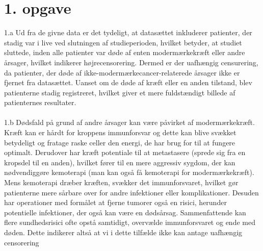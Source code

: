 \chapter{1. opgave}

1.a Ud fra de givne data er det tydeligt, at datasættet inkluderer patienter, der stadig var i live ved slutningen af studieperioden, hvilket betyder, at studiet sluttede, inden alle patienter var døde af enten modermærkekræft eller andre årsager, hvilket indikerer højrecensorering. Dermed er der uafhængig censurering, da patienter, der døde af ikke-modermærkecancer-relaterede årsager ikke er fjernet fra datasættet. Uanset om de døde af kræft eller en anden tilstand, blev patienterne stadig registreret, hvilket giver et mere fuldstændigt billede af patienternes resultater.\\\\

1.b Dødsfald på grund af andre årsager kan være påvirket af modermærkekræft. Kræft kan er hårdt for kroppens immunforsvar og dette kan blive svækket betydeligt og fratage raske celler den energi, de har brug for til at fungere optimalt. Derudover har kræft potentiale til at metastasere (sprede sig fra en kropsdel til en anden), hvilket fører til en mere aggressiv sygdom, der kan nødvendiggøre kemoterapi (man kan også få kemoterapi for modermærkekræft). Mens kemoterapi dræber kræften, svækker det immunforsvaret, hvilket gør patienterne mere sårbare over for andre infektioner eller komplikationer. Desuden har operationer med formålet at fjerne tumorer også en risici, herunder potentielle infektioner, der også kan være en dødsårsag. Sammenfattende kan flere sundhedsrisici ofte opstå samtidigt, overvælde immunforsvaret og ende med døden. Dette indikerer altså at vi i dette tilfælde ikke kan antage uafhængig censorering



